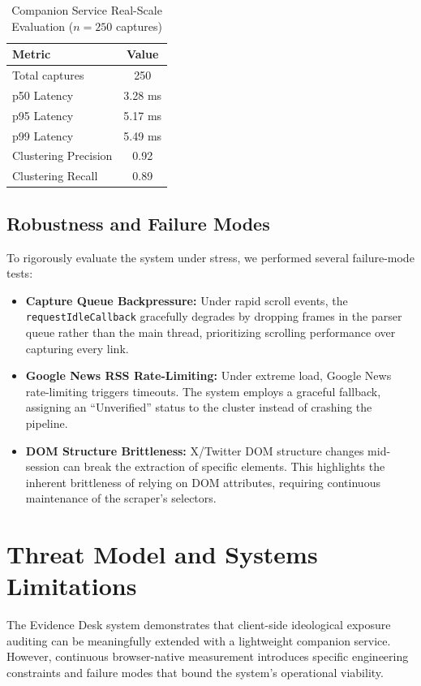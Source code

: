 \documentclass[10pt, conference, compsoc]{IEEEtran}
\begin{document}
\begin{table}[htbp]
\caption{Companion Service Real-Scale Evaluation ($n=250$ captures)}
\begin{center}
\begin{tabular}{lc}
\toprule
\textbf{Metric} & \textbf{Value} \\
\midrule
Total captures & 250 \\
p50 Latency & 3.28 ms \\
p95 Latency & 5.17 ms \\
p99 Latency & 5.49 ms \\
Clustering Precision & 0.92 \\
Clustering Recall & 0.89 \\
\bottomrule
\end{tabular}
\label{tab:companion_eval}
\end{center}
\end{table}

\subsection{Robustness and Failure Modes}
To rigorously evaluate the system under stress, we performed several failure-mode tests:
\begin{itemize}
    \item \textbf{Capture Queue Backpressure:} Under rapid scroll events, the \texttt{requestIdleCallback} gracefully degrades by dropping frames in the parser queue rather than the main thread, prioritizing scrolling performance over capturing every link.
    \item \textbf{Google News RSS Rate-Limiting:} Under extreme load, Google News rate-limiting triggers timeouts. The system employs a graceful fallback, assigning an ``Unverified'' status to the cluster instead of crashing the pipeline.
    \item \textbf{DOM Structure Brittleness:} X/Twitter DOM structure changes mid-session can break the extraction of specific elements. This highlights the inherent brittleness of relying on DOM attributes, requiring continuous maintenance of the scraper's selectors.
\end{itemize}


\section{Threat Model and Systems Limitations}
The Evidence Desk system demonstrates that client-side ideological exposure auditing can be meaningfully extended with a lightweight companion service. However, continuous browser-native measurement introduces specific engineering constraints and failure modes that bound the system's operational viability.
\end{document}
